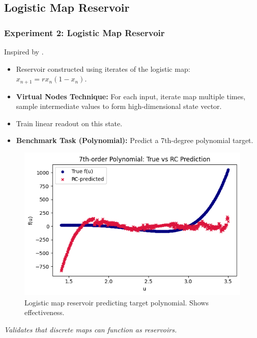 \documentclass{beamer}
\begin{document}
\subsection{Logistic Map Reservoir}

\begin{frame}
    \frametitle{Experiment 2: Logistic Map Reservoir}
    Inspired by \cite{Arun2024}.
    \begin{itemize}
        \item Reservoir constructed using iterates of the logistic map: $x_{n+1} = r x_n (1 - x_n)$.
        \item \textbf{Virtual Nodes Technique:} For each input, iterate map multiple times, sample intermediate values to form high-dimensional state vector.
        \item Train linear readout on this state. \pause
        \item \textbf{Benchmark Task (Polynomial):} Predict a 7th-degree polynomial target.
    \end{itemize}
    \begin{figure}
        \centering
        \includegraphics[width=0.7\linewidth]{figures/logistic_7th_degree.png}
        \caption{Logistic map reservoir predicting target polynomial. Shows effectiveness.}
        \label{fig:logistic_map_slide}
    \end{figure}
    \textit{Validates that discrete maps can function as reservoirs.}
\end{frame}
\end{document}
